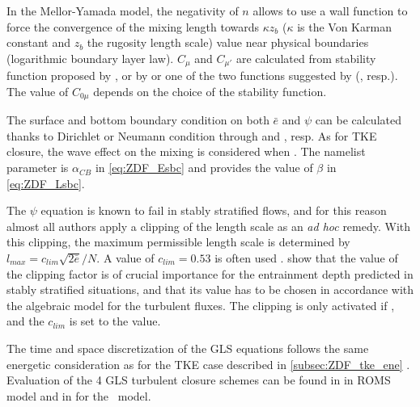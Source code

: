 \documentclass[../main/NEMO_manual]{subfiles}
\begin{document}
In the Mellor-Yamada model, the negativity of $n$ allows to use a wall function to force the convergence of
the mixing length towards $\kappa z_b$ ($\kappa$ is the Von Karman constant and $z_b$ the rugosity length scale) value near physical boundaries
(logarithmic boundary layer law).
$C_{\mu}$ and $C_{\mu'}$ are calculated from stability function proposed by \citet{galperin.kantha.ea_JAS88},
or by \citet{kantha.clayson_JGR94} or one of the two functions suggested by \citet{canuto.howard.ea_JPO01}
(, resp.).
The value of $C_{0\mu}$ depends on the choice of the stability function.

The surface and bottom boundary condition on both $\bar{e}$ and $\psi$ can be calculated thanks to Dirichlet or
Neumann condition through  and , resp.
As for TKE closure, the wave effect on the mixing is considered when
 \citep{craig.banner_JPO94, mellor.blumberg_JPO04}.
The  namelist parameter is $\alpha_{CB}$ in \autoref{eq:ZDF_Esbc} and
 provides the value of $\beta$ in \autoref{eq:ZDF_Lsbc}.

The $\psi$ equation is known to fail in stably stratified flows, and for this reason
almost all authors apply a clipping of the length scale as an \textit{ad hoc} remedy.
With this clipping, the maximum permissible length scale is determined by $l_{max} = c_{lim} \sqrt{2\bar{e}}/ N$.
A value of $c_{lim} = 0.53$ is often used \citep{galperin.kantha.ea_JAS88}.
\cite{umlauf.burchard_CSR05} show that the value of the clipping factor is of crucial importance for
the entrainment depth predicted in stably stratified situations,
and that its value has to be chosen in accordance with the algebraic model for the turbulent fluxes.
The clipping is only activated if ,
and the $c_{lim}$ is set to the  value.

The time and space discretization of the GLS equations follows the same energetic consideration as for
the TKE case described in \autoref{subsec:ZDF_tke_ene} \citep{burchard_OM02}.
Evaluation of the 4 GLS turbulent closure schemes can be found in \citet{warner.sherwood.ea_OM05} in ROMS model and
 in \citet{reffray.guillaume.ea_GMD15} for the \NEMO\ model.

\end{document}
